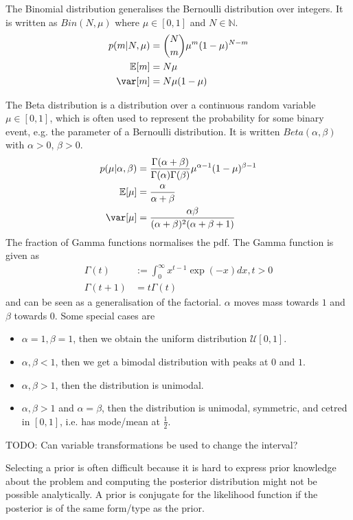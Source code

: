 The Binomial distribution generalises the Bernoulli distribution over
integers. It is written as $Bin(N, \mu)$ where
$\mu \in [0, 1]$ and $N \in \mathbb{N}$.
\begin{align*}
    p(m | N, \mu) &= \binom{N}{m} \mu^m (1 - \mu)^{N - m} \\
    \mathbb{E}[m] &= N \mu \\
    \var[m] &= N \mu (1 - \mu)
\end{align*}

The Beta distribution is a distribution over a continuous random variable
$\mu \in [0, 1]$, which is often used to represent the probability for
some binary event, e.g. the parameter of a Bernoulli distribution.
It is written $Beta(\alpha, \beta)$ with $\alpha > 0$, $\beta > 0$.
\begin{align*}
    p(\mu | \alpha, \beta) &=
        \frac{\Gamma(\alpha + \beta)}{\Gamma(\alpha)\Gamma(\beta)}
        \mu^{\alpha - 1} (1 - \mu)^{\beta - 1} \\
    \mathbb{E}[\mu] &= \frac{\alpha}{\alpha + \beta} \\
    \var[\mu] &= \frac{\alpha \beta}{
        (\alpha + \beta)^2 (\alpha + \beta + 1)
    }
\end{align*}
The fraction of Gamma functions normalises the pdf.
The Gamma function is given as
\begin{align*}
    \Gamma(t) &:= \int_0^\infty{x^{t-1} \exp(-x) dx}, t > 0 \\
    \Gamma(t + 1) &= t \Gamma(t)
\end{align*}
and can be seen as a generalisation of the factorial.
$\alpha$ moves mass towards $1$ and $\beta$ towards $0$.
Some special cases are
\begin{itemize}
    \item $\alpha = 1, \beta = 1$, then we obtain the uniform distribution
        $\mathcal{U}[0, 1]$.
    \item $\alpha, \beta < 1$, then we get a bimodal distribution with
        peaks at $0$ and $1$.
    \item $\alpha, \beta > 1$, then the distribution is unimodal.
    \item $\alpha, \beta > 1$ and $\alpha = \beta$, then the distribution
        is unimodal, symmetric, and cetred in $[0, 1]$, i.e. has
        mode/mean at $\frac{1}{2}$.
\end{itemize}

TODO: Can variable transformations be used to change the interval?

Selecting a prior is often difficult because it is hard to express
prior knowledge about the problem and computing the posterior distribution
might not be possible analytically.
A prior is conjugate for the likelihood function if the posterior is
of the same form/type as the prior.

